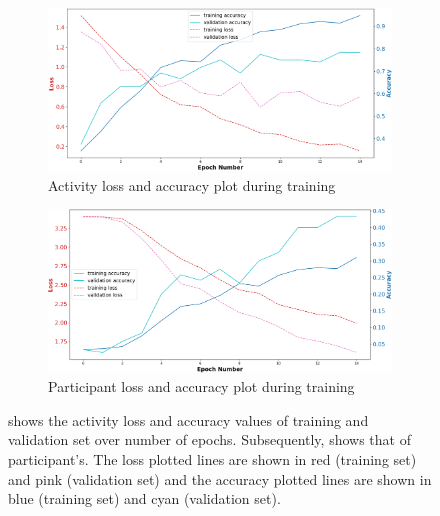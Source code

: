 \documentclass{l4proj}
\begin{document}
\begin{figure}[h]
   \centering
   \begin{subfigure}{0.47\textwidth}
        \includegraphics[width=\textwidth]{images/multitask-activity-initial-test.png}
        \caption{Activity loss and accuracy plot during training}
        \label{fig:multitask-activity-initial-test}
    \end{subfigure}
    \qquad
    \begin{subfigure}{0.47\textwidth}
        \includegraphics[width=\textwidth]{images/multitask-participant-initial-test.png}
        \caption{Participant loss and accuracy plot during training}
        \label{fig:multitask-participant-initial-test}
    \end{subfigure}
  \caption{ shows the activity loss and accuracy values of training and validation set over number of epochs. Subsequently,  shows that of participant's. The loss plotted lines are shown in red (training set) and pink (validation set) and the accuracy plotted lines are shown in blue (training set) and cyan (validation set).}
  \label{fig:multitask-initial-loss-and-accuracy-plots}
\end{figure}
\end{document}
